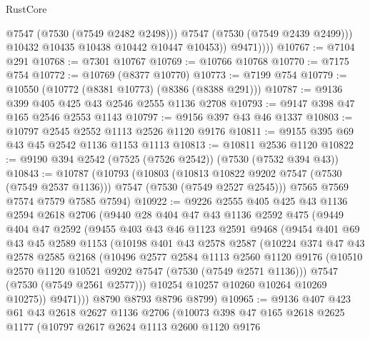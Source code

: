 \begin{lexlean}{RustCore}
\begin{coremodule}
                    @7547
                    (@7530 (@7549 @2482 @2498)))
                  @7547
                  (@7530 (@7549 @2439 @2499)))
                @10432
                @10435
                @10438
                @10442
                @10447
                @10453))
            @9471))))
@10767 := @7104 @291
@10768 := @7301 @10767
@10769 := @10766 @10768
@10770 := @7175 @754
@10772 := @10769 (@8377 @10770)
@10773 := @7199 @754
@10779 := @10550 (@10772 (@8381 @10773) (@8386 (@8388 @291)))
@10787 := @9136 @399 @405 @425 @43 @2546 @2555 @1136 @2708
@10793 := @9147 @398 @47 @165 @2546 @2553 @1143
@10797 := @9156 @397 @43 @46 @1337
@10803 := @10797 @2545 @2552 @1113 @2526 @1120 @9176
@10811 := @9155 @395 @69 @43 @45 @2542 @1136 @1153 @1113
@10813 := @10811 @2536 @1120
@10822 := @9190 @394 @2542 (@7525 (@7526 @2542)) (@7530 (@7532 @394 @43))
@10843 := @10787
    (@10793
      (@10803
        (@10813 @10822 @9202 @7547 (@7530 (@7549 @2537 @1136)))
        @7547
        (@7530 (@7549 @2527 @2545)))
      @7565
      @7569
      @7574
      @7579
      @7585
      @7594)
@10922 := @9226
    @2555
    @405
    @425
    @43
    @1136
    @2594
    @2618
    @2706
    (@9440
      @28
      @404
      @47
      @43
      @1136
      @2592
      @475
      (@9449
        @404
        @47
        @2592
        (@9455
          @403
          @43
          @46
          @1123
          @2591
          @9468
          (@9454
            @401
            @69
            @43
            @45
            @2589
            @1153
            (@10198
              @401
              @43
              @2578
              @2587
              (@10224
                @374
                @47
                @43
                @2578
                @2585
                @2168
                (@10496
                  @2577
                  @2584
                  @1113
                  @2560
                  @1120
                  @9176
                  (@10510 @2570 @1120 @10521 @9202 @7547 (@7530 (@7549 @2571 @1136)))
                  @7547
                  (@7530 (@7549 @2561 @2577)))
                @10254
                @10257
                @10260
                @10264
                @10269
                @10275))
            @9471)))
      @8790
      @8793
      @8796
      @8799)
@10965 := @9136
    @407
    @423
    @61
    @43
    @2618
    @2627
    @1136
    @2706
    (@10073
      @398
      @47
      @165
      @2618
      @2625
      @1177
      (@10797
        @2617
        @2624
        @1113
        @2600
        @1120
        @9176

\end{coremodule}
\end{lexlean}
